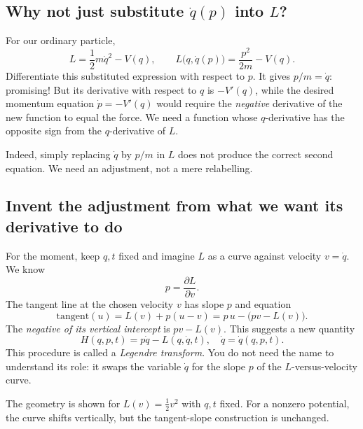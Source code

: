 \documentclass[11pt,a4paper,oneside]{article}
\newcommand{\pd}[2]{\frac{\partial #1}{\partial #2}}
\begin{document}
\subsection{Why not just substitute $\dot q(p)$ into $L$?}
For our ordinary particle,
\[
 L=\frac12m\dot q^2-V(q),\qquad
 L\bigl(q,\dot q(p)\bigr)=\frac{p^2}{2m}-V(q).
\]
Differentiate this substituted expression with respect to $p$. It gives $p/m=\dot q$: promising! But its derivative with respect to $q$ is $-V'(q)$, while the desired momentum equation $\dot p=-V'(q)$ would require the \emph{negative} derivative of the new function to equal the force. We need a function whose $q$-derivative has the opposite sign from the $q$-derivative of $L$.

Indeed, simply replacing $\dot q$ by $p/m$ in $L$ does not produce the correct second equation. We need an adjustment, not a mere relabelling.

\subsection{Invent the adjustment from what we want its derivative to do}
For the moment, keep $q,t$ fixed and imagine $L$ as a curve against velocity $v=\dot q$. We know
\[
 p=\pd{L}{v}.
\]
The tangent line at the chosen velocity $v$ has slope $p$ and equation
\[
 \text{tangent}(u)=L(v)+p(u-v)=p\,u-\bigl(pv-L(v)\bigr).
\]
The \emph{negative of its vertical intercept} is $pv-L(v)$. This suggests a new quantity
\begin{equation}\label{eq:legendre}
 \boxed{H(q,p,t)=p\dot q-L(q,\dot q,t),\quad
       \dot q=\dot q(q,p,t).}
\end{equation}
This procedure is called a \emph{Legendre transform}. You do not need the name to understand its role: it swaps the variable $\dot q$ for the slope $p$ of the $L$-versus-velocity curve.

\begin{center}
\end{center}
{\small\color{ink!70}The geometry is shown for $L(v)=\tfrac12v^2$ with $q,t$ fixed. For a nonzero potential, the curve shifts vertically, but the tangent-slope construction is unchanged.}
\end{document}
